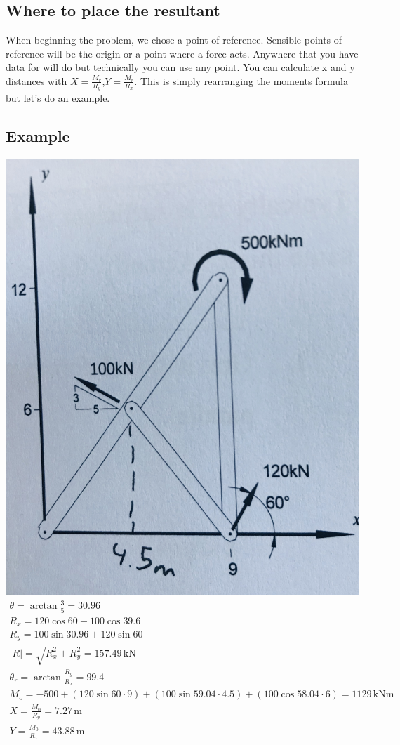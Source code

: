 \documentclass[a4paper, 12pt]{article}
\newcommand{\unit}[1]{\ensuremath{\, \mathrm{#1}}}
\begin{document}
\subsection{Where to place the resultant}
When beginning the problem, we chose a point of reference.
Sensible points of reference will be the origin or a point where a force acts.
Anywhere that you have data for will do but technically you can use any point.
You can calculate x and y distances with $X=\frac{M_r}{R_y}$,$Y=\frac{M_r}{R_x}$.
This is simply rearranging the moments formula but let's do an example.

\subsection{Example}
\includegraphics[scale=0.05]{4}
\begin{gather*}
    \theta = \arctan{\frac{3}{5}} = 30.96 \\
    R_x = 120\cos{60} - 100\cos{39.6} \\
    R_y = 100\sin{30.96} + 120\sin{60} \\
    |R| = \sqrt{R_x^2+R_y^2} = 157.49\unit{kN} \\
    \theta_r = \arctan{\frac{R_y}{R_x}} = 99.4 \\
    M_o = -500 + (120\sin{60}\cdot9) + (100\sin{59.04}\cdot4.5) + (100\cos{58.04}\cdot6) = 1129\unit{kNm} \\
    X = \frac{M_0}{R_y} = 7.27\unit{m} \\
    Y = \frac{M_0}{R_x} = 43.88\unit{m} \\
\end{gather*}
\end{document}
